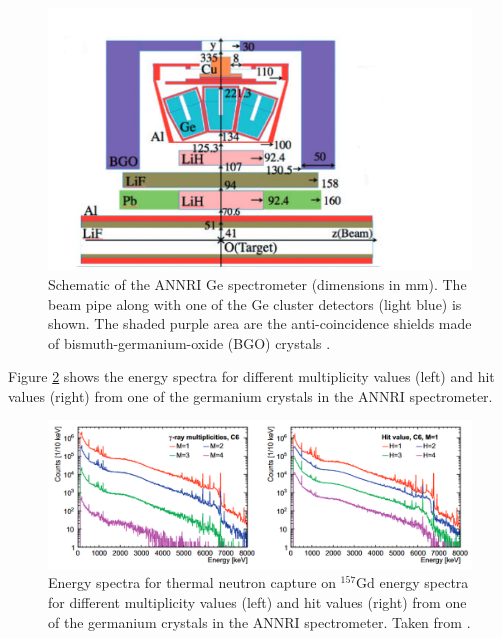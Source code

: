 \begin{figure}[htp]

        \includegraphics[width=\textwidth]{Figures/annrigd.png}
        \caption{Schematic of the ANNRI Ge spectrometer (dimensions in mm). The beam pipe along with one of the Ge cluster detectors (light blue) is shown. The shaded purple area are the anti-coincidence shields made of bismuth-germanium-oxide (BGO) crystals \cite{annri_gd_energy}.}
        \label{fig:annrigd}
    
\end{figure}

Figure \ref{fig:annrigdenergyspectra} shows the energy spectra for different multiplicity values (left) and hit values (right) from one of the germanium crystals in the ANNRI spectrometer. 

\begin{figure}[htp]
\includegraphics[width=\textwidth]{Figures/annrigdenergyspectra.png}
\caption{Energy spectra for thermal neutron capture on ${ }^{157} \mathrm{Gd}$ energy spectra for different multiplicity values (left) and hit values (right) from one of the germanium crystals in the ANNRI spectrometer. Taken from \cite{annri_gd_energy}.}
\label{fig:annrigdenergyspectra}
\end{figure}

